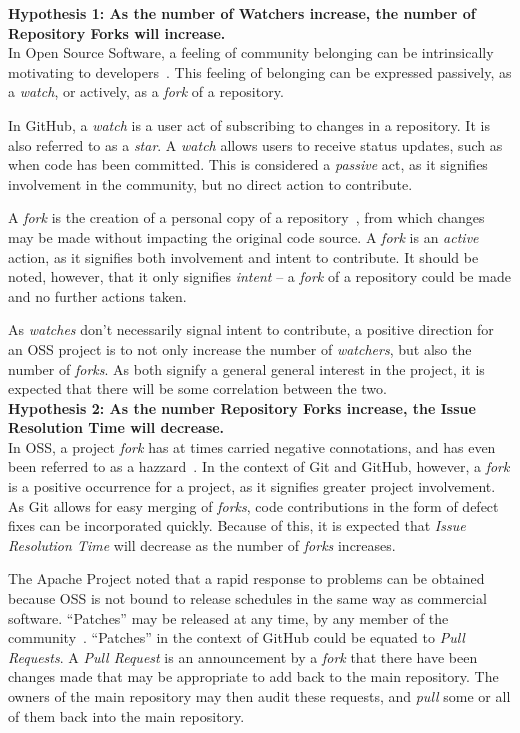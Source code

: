 \documentclass{proc}
\begin{document}
\noindent \textbf{Hypothesis 1: As the number of Watchers increase, the number of Repository Forks will increase.}\\
In Open Source Software, a feeling of community belonging can be intrinsically motivating to developers~\cite{lakhani2003hackers}. This feeling of belonging can be expressed passively, as a \emph{watch}, or actively, as a \emph{fork} of a repository. 

In GitHub, a \emph{watch} is a user act of subscribing to changes in a repository. It is also referred to as a \emph{star}. A \emph{watch} allows users to receive status updates, such as when code has been committed. This is considered a \emph{passive} act, as it signifies involvement in the community, but no direct action to contribute.

A \emph{fork} is the creation of a personal copy of a repository~\cite{dabbish2012social}, from which changes may be made without impacting the original code source. A \emph{fork} is an \emph{active} action, as it signifies both involvement and intent to contribute. It should be noted, however, that it only signifies \emph{intent} -- a \emph{fork} of a repository could be made and no further actions taken.

As \emph{watches} don't necessarily signal intent to contribute, a positive direction for an OSS project is to not only increase the number of \emph{watchers}, but also the number of \emph{forks}. As both signify a general general interest in the project, it is expected that there will be some correlation between the two.\\

\noindent \textbf{Hypothesis 2: As the number Repository Forks increase, the Issue Resolution Time will decrease.}\\
In OSS, a project \emph{fork} has at times carried negative connotations, and has even been referred to as a hazzard~\cite{kogut2001open}. In the context of Git and GitHub, however, a \emph{fork} is a positive occurrence for a project, as it signifies greater project involvement. As Git allows for easy merging of \emph{forks}, code contributions in the form of defect fixes can be incorporated quickly. Because of this, it is expected that \emph{Issue Resolution Time} will decrease as the number of \emph{forks} increases.

The Apache Project noted that a rapid response to problems can be obtained because OSS is not bound to release schedules in the same way as commercial software. ``Patches'' may be released at any time, by any member of the community~\cite{mockus2000case}. ``Patches'' in the context of GitHub could be equated to \emph{Pull Requests}. A \emph{Pull Request} is an announcement by a \emph{fork} that there have been changes made that may be appropriate to add back to the main repository. The owners of the main repository may then audit these requests, and \emph{pull} some or all of them back into the main repository.
\end{document}
